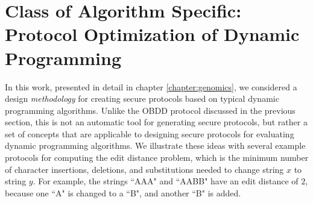 \begin{comment}
\section{Problem Specific: Protocol Optimization of Evaluating Hash Functions
for Password Authentication}

In chapter \ref{chapter:pw}, based on our paper Secure Password Authentication
Using SFE \cite{kruger10}, we use some properties of the problem
of authentication to transform the semi-honest protocol into an efficient
protocol that is secure in the malicious model. This work presents
a new solution to the {}``Password Authenticated Key Exchange''
(PAKE) problem, which is the design of protocols to mutually authenticate
a client to a server using 
\begin{enumerate}
\item The client's knowledge of the password $X$, and 
\item The servers's knowledge of a one-way hash function $h(X)$. 
\end{enumerate}
The protocol must not leak any additional information or allow access
if one of the parties is an imposter and does not know their expected
credential. Our solution provides a property, unique among PAKE protocols,
that it can work with arbitrary and legacy hash functions used in
commodity operating systems today. This protocol takes advantage of
specific properties of the authentication problem and takes {}``shortcuts''
to achieve efficiency. Although these shortcuts would not be secure
in a general SFE setting, we prove that these shortcuts are in fact
secure in the context of the authentication protocol presented. This
allows us to design a protocol in which a malicious adversary is thwarted
with probability $1-2^{-l}$ where $l$ is a security parameter representing
the number of semi-honest circuits. We show that on modern multicore
processors, the authentication can be performed in a matter of seconds,
which we believe is practical for interactive use between servers
and authenticating users.
\end{comment}

\section{Class of Algorithm Specific: Protocol Optimization of Dynamic Programming}

In this work, presented in detail in chapter \ref{chapter:genomics},
we considered a design \emph{methodology} for creating secure protocols
based on typical dynamic programming algorithms. Unlike the OBDD protocol
discussed in the previous section, this is not an automatic tool for
generating secure protocols, but rather a set of concepts that are
applicable to designing secure protocols for evaluating dynamic programming
algorithms. We illustrate these ideas with several example protocols
for computing the edit distance problem, which is the minimum number
of character insertions, deletions, and substitutions needed to change
string $x$ to string $y$.  For example, the strings ``AAA" and ``AABB" have an edit
distance of $2$, because one ``A" is changed to a ``B", and another ``B" is added.

